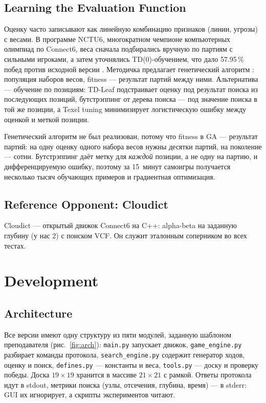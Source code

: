 \documentclass[a4paper,10pt,twocolumn]{article}
\newcommand{\code}[1]{\texttt{#1}}
\begin{document}
\subsection{Learning the Evaluation Function}
Оценку часто записывают как линейную комбинацию признаков (линии, угрозы) с весами. В программе NCTU6, многократном чемпионе компьютерных олимпиад по Connect6, веса сначала подбирались вручную по партиям с сильными игроками, а затем уточнялись TD(0)-обучением, что дало 57.95\,\% побед против исходной версии \citep{wu2012td}. Методичка предлагает генетический алгоритм \citep{statement}: популяция наборов весов, fitness --- результат партий между ними. Альтернатива --- обучение по позициям: TD-Leaf \citep{baxter2000tdleaf} подстраивает оценку под результат поиска из последующих позиций, бутстрэппинг от дерева поиска \citep{veness2009bootstrapping} --- под значение поиска в той же позиции, а Texel tuning \citep{texel} минимизирует логистическую ошибку между оценкой и меткой позиции.

Генетический алгоритм не был реализован, потому что fitness в GA --- результат партий: на одну оценку одного набора весов нужны десятки партий, на поколение --- сотни. Бутстрэппинг даёт метку для \emph{каждой} позиции, а не одну на партию, и дифференцируемую ошибку, поэтому за 15~минут самоигры получается несколько тысяч обучающих примеров и градиентная оптимизация.

\subsection{Reference Opponent: Cloudict}
Cloudict \citep{cloudict} --- открытый движок Connect6 на C++: alpha-beta на заданную глубину (у нас 2) с поиском VCF. Он служит эталонным соперником во всех тестах.

\section{Development}\label{sec:dev}

\subsection{Architecture}
Все версии имеют одну структуру из пяти модулей, заданную шаблоном преподавателя (рис.~\ref{fig:arch}): \code{main.py} запускает движок, \code{game\_engine.py} разбирает команды протокола, \code{search\_engine.py} содержит генератор ходов, оценку и поиск, \code{defines.py} --- константы и веса, \code{tools.py} --- доску и проверку победы. Доска $19\times19$ хранится в массиве $21\times21$ с рамкой. Ответы протокола идут в stdout, метрики поиска (узлы, отсечения, глубина, время) --- в stderr: GUI их игнорирует, а скрипты экспериментов читают.
\end{document}
